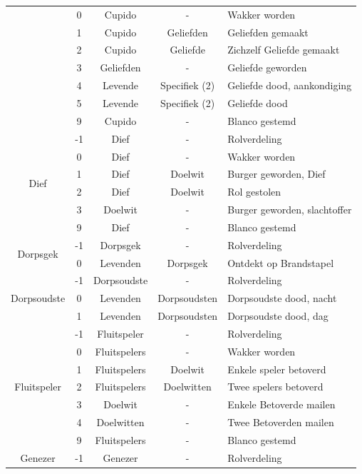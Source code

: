\documentclass[12pt]{article}
\begin{document}
\begin{center}
\begin{longtable}{c|c|c|c|l}
       & 0 & Cupido & - & Wakker worden \\
       & 1 & Cupido & Geliefden & Geliefden gemaakt \\
       & 2 & Cupido & Geliefde & Zichzelf Geliefde gemaakt \\
       & 3 & Geliefden & - & Geliefde geworden \\
       & 4 & Levende & Specifiek (2) & Geliefde dood, aankondiging \\
       & 5 & Levende & Specifiek (2) & Geliefde dood \\
       & 9 & Cupido & - & Blanco gestemd \\
      \hline
      \multirow{6}{*}{Dief} & -1 & Dief & - & Rolverdeling \\
       & 0 & Dief & - & Wakker worden \\
       & 1 & Dief & Doelwit & Burger geworden, Dief \\
       & 2 & Dief & Doelwit & Rol gestolen \\
       & 3 & Doelwit & - & Burger geworden, slachtoffer \\
       & 9 & Dief & - & Blanco gestemd \\
      \hline
      \multirow{2}{*}{Dorpsgek} & -1 & Dorpsgek & - & Rolverdeling \\
       & 0 & Levenden & Dorpsgek & Ontdekt op Brandstapel \\
      \hline
      \multirow{3}{*}{Dorpsoudste} & -1 & Dorpsoudste & - & Rolverdeling \\
       & 0 & Levenden & Dorpsoudsten & Dorpsoudste dood, nacht \\
       & 1 & Levenden & Dorpsoudsten & Dorpsoudste dood, dag \\
      \hline
      \multirow{7}{*}{Fluitspeler} & -1 & Fluitspeler & - & Rolverdeling \\
       & 0 & Fluitspelers & - & Wakker worden \\
       & 1 & Fluitspelers & Doelwit & Enkele speler betoverd \\
       & 2 & Fluitspelers & Doelwitten & Twee spelers betoverd \\
       & 3 & Doelwit & - & Enkele Betoverde mailen \\
       & 4 & Doelwitten & - & Twee Betoverden mailen \\
       & 9 & Fluitspelers & - & Blanco gestemd \\
      \hline
      \multirow{4}{*}{Genezer} & -1 & Genezer & - & Rolverdeling \\

\end{longtable}
\end{center}
\end{document}
